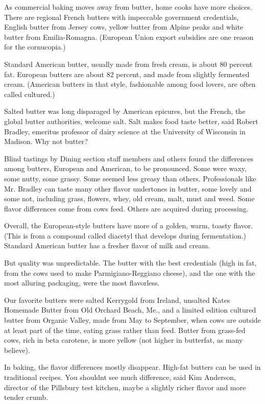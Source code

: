 \documentclass[12pt,landscape,twoside,twocolumn, openright, titlepage, draft]{book}
\begin{document}
As commercial baking moves away from butter, home cooks have more choices. There are regional French butters with impeccable government credentials, English butter from Jersey cows, yellow butter from Alpine peaks and white butter from Emilia-Romagna. (European Union export subsidies are one reason for the cornucopia.)

Standard American butter, usually made from fresh cream, is about 80 percent fat. European butters are about 82 percent, and made from slightly fermented cream. (American butters in that style, fashionable among food lovers, are often called cultured.)

Salted butter was long disparaged by American epicures, but the French, the global butter authorities, welcome salt. Salt makes food taste better, said Robert Bradley, emeritus professor of dairy science at the University of Wisconsin in Madison. Why not butter?

Blind tastings by Dining section staff members and others found the differences among butters, European and American, to be pronounced. Some were waxy, some nutty, some grassy. Some seemed less greasy than others. Professionals like Mr. Bradley can taste many other flavor undertones in butter, some lovely and some not, including grass, flowers, whey, old cream, malt, must and weed. Some flavor differences come from cows feed. Others are acquired during processing.

Overall, the European-style butters have more of a golden, warm, toasty flavor. (This is from a compound called diacetyl that develops during fermentation.) Standard American butter has a fresher flavor of milk and cream.

But quality was unpredictable. The butter with the best credentials (high in fat, from the cows used to make Parmigiano-Reggiano cheese), and the one with the most alluring packaging, were the most flavorless.

Our favorite butters were salted Kerrygold from Ireland, unsalted Kates Homemade Butter from Old Orchard Beach, Me., and a limited edition cultured butter from Organic Valley, made from May to September, when cows are outside at least part of the time, eating grass rather than feed. Butter from grass-fed cows, rich in beta carotene, is more yellow (not higher in butterfat, as many believe).

In baking, the flavor differences mostly disappear. High-fat butters can be used in traditional recipes. You shouldnt see much difference, said Kim Anderson, director of the Pillsbury test kitchen, maybe a slightly richer flavor and more tender crumb.
\end{document}
